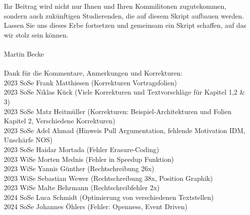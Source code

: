 \documentclass[a4paper]{article}
\begin{document}
Ihr Beitrag wird nicht nur Ihnen und Ihren Kommilitonen zugutekommen, sondern auch zukünftigen Studierenden, die auf diesem Skript aufbauen werden. Lassen Sie uns dieses Erbe fortsetzen und gemeinsam ein Skript schaffen, auf das wir stolz sein können.
\\\\
Martin Becke
\\\\
Dank für die Kommentare, Anmerkungen und Korrekturen:  \\
2023 SoSe Frank Matthiesen (Korrekturen Vortragsfolien) \\
2023 SoSe Niklas Kück (Viele Korrekturen und Textvorschläge für Kapitel 1,2 \& 3)\\
2023 SoSe Matz Heitmüller (Korrekturen: Beispiel-Architekturen und Folien Kapitel 2, Verschiedene Korrekturen) \\
2023 SoSe Adel Ahmad (Hinweis Pull Argumentation, fehlende Motivation IDM, Unschärfe NOS) \\
2023 SoSe Haidar Mortada (Fehler  Erasure-Coding) \\
2023 WiSe Morten Mednis (Fehler in Speedup Funktion) \\
2023 WiSe Yannis Günther (Rechtschreibung 26x) \\
2023 WiSe Sebastian Wewer (Rechtschreibung 38x, Position Graphik) \\
2023 WiSe Malte Behrmann (Rechtschreibfehler 2x)\\
2024 SoSe Luca Schmidt (Optimierung von verschiedenen Textstellen) \\
2024 SoSe Johannes Öhlers (Fehler: Openness, Event Driven)\\
\\
\tableofcontents
\newpage

\newpage

\newpage

\newpage


\newpage
\end{document}
